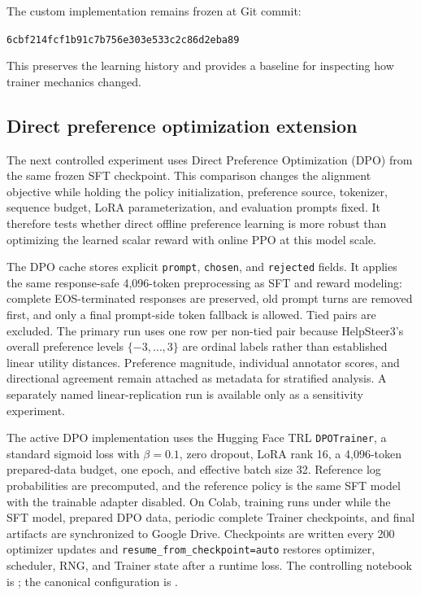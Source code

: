 \documentclass[11pt]{article}
\newcommand{\trl}{\textsc{TRL}}
\begin{document}
The custom implementation remains frozen at Git commit:
\begin{center}
{\small\texttt{6cbf214fcf1b91c7b756e303e533c2c86d2eba89}}
\end{center}
This preserves the learning history and provides a baseline for inspecting how
trainer mechanics changed.

\subsection{Direct preference optimization extension}

The next controlled experiment uses Direct Preference Optimization (DPO)
\cite{rafailov2023} from the same frozen SFT checkpoint. This comparison
changes the alignment objective while holding the policy initialization,
preference source, tokenizer, sequence budget, LoRA parameterization, and
evaluation prompts fixed. It therefore tests whether direct offline preference
learning is more robust than optimizing the learned scalar reward with online
PPO at this model scale.

The DPO cache stores explicit \texttt{prompt}, \texttt{chosen}, and
\texttt{rejected} fields. It applies the same response-safe 4,096-token
preprocessing as SFT and reward modeling: complete EOS-terminated responses
are preserved, old prompt turns are removed first, and only a final prompt-side
token fallback is allowed. Tied pairs are excluded. The primary run uses one
row per non-tied pair because HelpSteer3's overall preference levels
$\{-3,\ldots,3\}$ are ordinal labels rather than established linear utility
distances. Preference magnitude, individual annotator scores, and directional
agreement remain attached as metadata for stratified analysis. A separately
named linear-replication run is available only as a sensitivity experiment.

The active DPO implementation uses the Hugging Face \trl{}
\texttt{DPOTrainer}, a standard sigmoid loss with $\beta=0.1$, zero dropout,
LoRA rank 16, a 4,096-token prepared-data budget, one epoch, and effective
batch size 32. Reference log probabilities are precomputed, and the reference
policy is the same SFT model with the trainable adapter disabled. On Colab,
training runs under  while the SFT model, prepared DPO data,
periodic complete Trainer checkpoints, and final artifacts are synchronized
to Google Drive. Checkpoints are written every 200 optimizer updates and
\texttt{resume\_from\_checkpoint=auto} restores optimizer, scheduler, RNG, and
Trainer state after a runtime loss. The controlling notebook is
; the canonical configuration is
.
\end{document}
